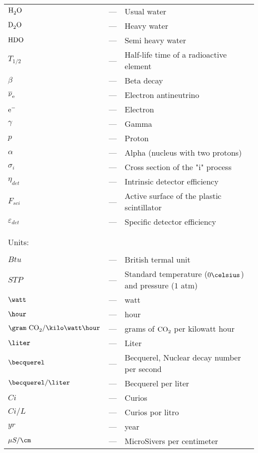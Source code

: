 \begin{longtable}{p{25mm} c p{120mm} }
$\ce{H_{2}O}$ & --- & Usual water\\
$\ce{D_{2}O}$ & --- & Heavy water\\
$\ce{HDO}$ & --- & Semi heavy water\\
$T_{1/2}$ & --- & Half-life time of a radioactive element\\
$\beta$ & --- & Beta decay\\
$\ce{\overline{\nu}_e}$ & --- & Electron antineutrino\\
$\ce{e^-}$ & --- & Electron\\
$\gamma$ & --- & Gamma\\
$p$ & --- & Proton\\
$\alpha$ & --- & Alpha (nucleus with two protons)\\
$\sigma_i$ & --- & Cross section of the "i" process\\
$\eta_{det}$ & --- & Intrinsic detector efficiency\\
$F_{sci}$ & --- & Active surface of the plastic scintillator\\
$\varepsilon_{det}$ & --- & Specific detector efficiency\\


\\
\\

\multicolumn{3}{l}{Units:}\\
\\
$Btu$ & --- & British termal unit\\
$STP$ & --- & Standard temperature ($0\celsius$) and pressure ($1$ atm)\\
$\watt$ & --- & watt\\
$\hour$ & --- & hour\\
$\gram~\ce{CO_2} /\kilo\watt\hour$ & --- & grams of $\ce{CO_2}$ per kilowatt hour\\
$\liter$ & --- & Liter\\
$\becquerel$ & --- & Becquerel, Nuclear decay number per second\\
$\becquerel/\liter$ & --- & Becquerel per liter\\
$Ci$ & --- & Curios\\
$Ci/L$ & --- & Curios por litro\\
$yr$ & --- & year\\
$\mu S/\cm$ & --- & MicroSivers per centimeter\\



\end{longtable}
